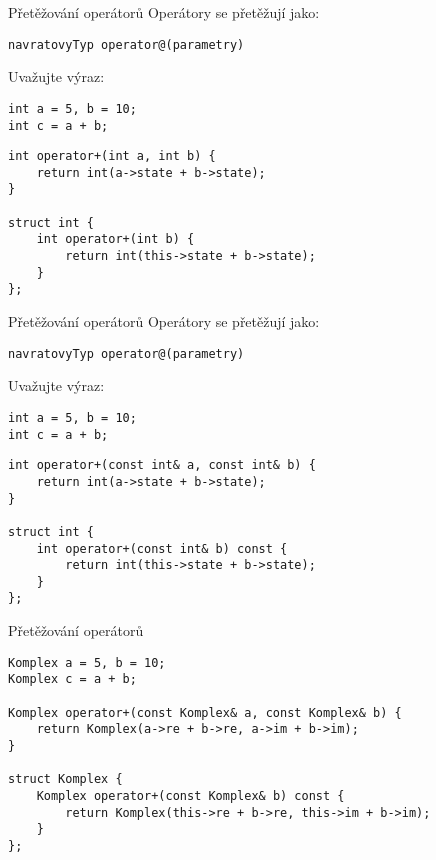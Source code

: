 \begin{frame}[fragile]
\begin{block}{Přetěžování operátorů} 
Operátory se přetěžují jako:
\begin{lstlisting}
navratovyTyp operator@(parametry)
\end{lstlisting}

Uvažujte výraz:
\begin{lstlisting}
int a = 5, b = 10;
int c = a + b;
\end{lstlisting}
\end{block}
\begin{exampleblock}{}

\begin{lstlisting}
int operator+(int a, int b) {
	return int(a->state + b->state);
}

struct int {
	int operator+(int b) {
		return int(this->state + b->state);
	}
};
\end{lstlisting}
\end{exampleblock}
\end{frame}



\begin{frame}[fragile]
\begin{block}{Přetěžování operátorů} 
Operátory se přetěžují jako:
\begin{lstlisting}
navratovyTyp operator@(parametry)
\end{lstlisting}

Uvažujte výraz:
\begin{lstlisting}
int a = 5, b = 10;
int c = a + b;
\end{lstlisting}
\end{block}
\begin{exampleblock}{}

\begin{lstlisting}
int operator+(const int& a, const int& b) {
	return int(a->state + b->state);
}

struct int {
	int operator+(const int& b) const {
		return int(this->state + b->state);
	}
};
\end{lstlisting}
\end{exampleblock}
\end{frame}



\begin{frame}[fragile]
\begin{exampleblock}{Přetěžování operátorů} 
\begin{lstlisting}
Komplex a = 5, b = 10;
Komplex c = a + b;

Komplex operator+(const Komplex& a, const Komplex& b) {
	return Komplex(a->re + b->re, a->im + b->im);
}

struct Komplex {
	Komplex operator+(const Komplex& b) const {
		return Komplex(this->re + b->re, this->im + b->im);
	}
};
\end{lstlisting}
\end{exampleblock}
\end{frame}




